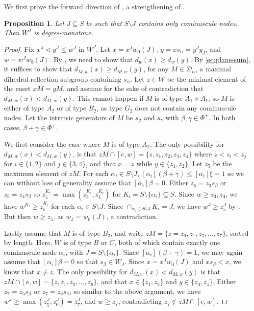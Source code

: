 \documentclass[11pt]{amsart}
\newtheorem{proposition}[proposition]{Proposition}
\theoremstyle{definition}
\theoremstyle{remark}
\numberwithin{equation}{section}
\begin{document}
We first prove the forward direction of , a strengthening of \cite[Thm.~1.4]{BG}.
\begin{proposition}\label{prop:cominuscule}
Let $J\subseteq S$ be such that $S\setminus J$ contains only cominuscule nodes. Then $W^J$ is degree-monotone.
\end{proposition}
\begin{proof}
Fix $x^J\lessdot y^J\leq w^J$ in $W^J$. Let $x=x^Jw_0(J)$, $y=xs_{\alpha}=y^Jy_J$, and $w=w^Jw_0(J)$. By , we need to show that $d_w(x)\geq d_w(y)$. By \eqref{eq:plane-sum}, it suffices to show that $d_{M,w}(x)\geq d_{M,w}(y)$, for any $M\in\mathcal{D}_{\alpha}$, a maximal dihedral reflection subgroup containing $s_{\alpha}$. Let $z\in W$ be the minimal element of the coset $xM=yM$, and assume for the sake of contradiction that $d_{M,w}(x)<d_{M,w}(y)$. This cannot happen if $M$ is of type $A_1\times A_1$, so $M$ is either of type $A_2$ or of type $B_2$, as type $G_2$ does not contain any cominuscule nodes. Let the intrinsic generators of $M$ be $s_{\beta}$ and $s_{\gamma}$ with $\beta,\gamma\in\Phi^+$. In both cases, $\beta+\gamma\in\Phi^+$.

We first consider the case where $M$ is of type $A_2$. The only possibility for $d_{M,w}(x)<d_{M,w}(y)$, is that $zM\cap[e,w]=\{z,z_1,z_2,z_3,z_4\}$ where $z< z_i< z_j$ for $i\in\{1,2\}$ and $j\in\{3,4\}$, and that $x=z$ while $y\in\{z_1,z_2\}$. Let $z_5$ be the maximum element of $zM$. For each $\alpha_i\in S\setminus J$, $[\alpha_i](\beta+\gamma)\leq[\alpha_i]\xi=1$ so we can without loss of generality assume that $[\alpha_i]\beta=0$. Either $z_5=z_3s_{\beta}$ or $z_5=z_4s_{\beta}$ so $z_5^{K_i}=\max(z_3^{K_i},z_4^{K_i})$ for $K_i=S\setminus\{\alpha_i\}\subseteq S$. Since $w\geq z_3,z_4$, we have $w^{K_i}\geq z_5^{K_i}$ for each $\alpha_i\in S\setminus J$. Since $\cap _{\alpha_i\in S\setminus J}K_i=J$, we have $w^J\geq z_5^J$ by \cite[Thm.~2.6.1]{BB}. But then $w\geq z_5$, as $w_J=w_0(J)$, a contradiction. 

Lastly assume that $M$ is of type $B_2$, and write $zM=\{z=z_0,z_1,z_2,\ldots,z_7\}$, sorted by length. Here, $W$ is of type $B$ or $C$, both of which contain exactly one cominuscule node $\alpha_i$, with $J=S\setminus\{\alpha_i\}$. Since $[\alpha_i](\beta+\gamma)=1$, we may again assume that $[\alpha_i]\beta=0$ so that $s_{\beta}\in W_J$. Since $x=x^Jw_0(J)$ and $xs_{\beta}<x$, we know that $x\neq z$. The only possibility for $d_{M,w}(x)<d_{M,w}(y)$ is that $zM\cap[e,w]=\{z,z_1,z_2,\ldots,z_6\}$, and that $x\in\{z_1,z_2\}$ and $y\in\{z_3,z_4\}$. Either $z_7=z_5s_{\beta}$ or $z_7=z_6s_{\beta}$, so similar to the above argument, we have $w^J\geq\max(z_5^J,z_6^J)=z_7^J$, and $w\geq z_7$, contradicting $z_7\notin zM\cap[e,w]$. 
\end{proof}
\end{document}
